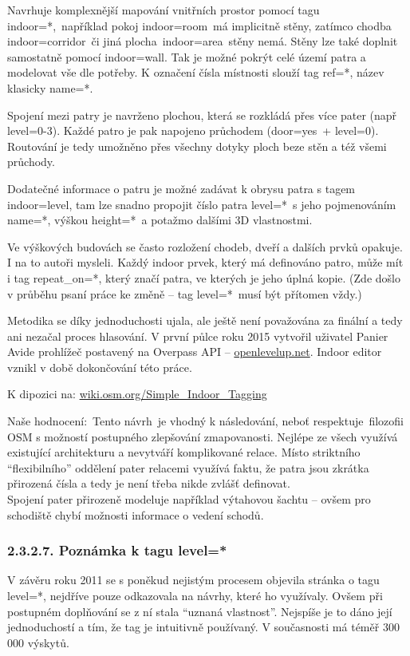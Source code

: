 Navrhuje komplexnější mapování vnitřních prostor pomocí tagu indoor=*,~například pokoj indoor=room~má implicitně stěny, zatímco chodba indoor=corridor~či jiná plocha~indoor=area~stěny nemá. Stěny lze také doplnit samostatně pomocí indoor=wall. Tak je možné pokrýt celé území patra a modelovat vše dle potřeby. K označení čísla místnosti slouží tag ref=*, název klasicky name=*.

Spojení mezi patry je navrženo plochou, která se rozkládá přes více pater (např level=0-3). Každé patro je pak napojeno průchodem (door=yes~+ level=0). Routování je tedy umožněno přes všechny dotyky ploch beze stěn a též všemi průchody.

Dodatečné informace o patru je možné zadávat k obrysu patra s tagem indoor=level, tam lze snadno propojit číslo patra level=*~s jeho pojmenováním name=*, výškou height=*~a potažmo dalšími 3D vlastnostmi.

Ve výškových budovách se často rozložení chodeb, dveří a dalších prvků opakuje. I na to autoři mysleli. Každý indoor prvek, který má definováno patro, může mít i tag repeat\_on=*, který značí patra, ve kterých je jeho úplná kopie. (Zde došlo v průběhu psaní práce ke změně -- tag level=*~musí být přítomen vždy.)

Metodika se díky jednoduchosti ujala, ale ještě není považována za finální a tedy ani nezačal proces hlasování. V první půlce roku 2015 vytvořil uživatel Panier Avide prohlížeč postavený na Overpass API -- \href{}{openlevelup.net}. Indoor editor vznikl v době dokončování této práce.

K dipozici na: \href{}{wiki.osm.org/Simple\_Indoor\_Tagging}

Naše hodnocení:~Tento návrh~je vhodný k následování, neboť respektuje~filozofii OSM s možností postupného zlepšování zmapovanosti. Nejlépe ze všech využívá existující architekturu a nevytváří komplikované relace. Místo striktního ``flexibilního'' oddělení pater relacemi využívá faktu, že patra jsou zkrátka přirozená čísla a tedy je není třeba nikde zvlášť definovat.\\
Spojení pater přirozeně modeluje například výtahovou šachtu -- ovšem pro schodiště chybí možnosti informace o vedení schodů.

\subsubsection{2.3.2.7. Poznámka k tagu level=*}\label{poznuxe1mka-k-tagu-level}

V závěru roku 2011 se s poněkud nejistým procesem objevila stránka o tagu level=*, nejdříve pouze odkazovala na návrhy, které ho využívaly. Ovšem při postupném doplňování se z ní stala ``uznaná vlastnost''. Nejspíše je to dáno její jednoduchostí a tím, že tag je intuitivně používaný. V současnosti má téměř 300 000 výskytů.

